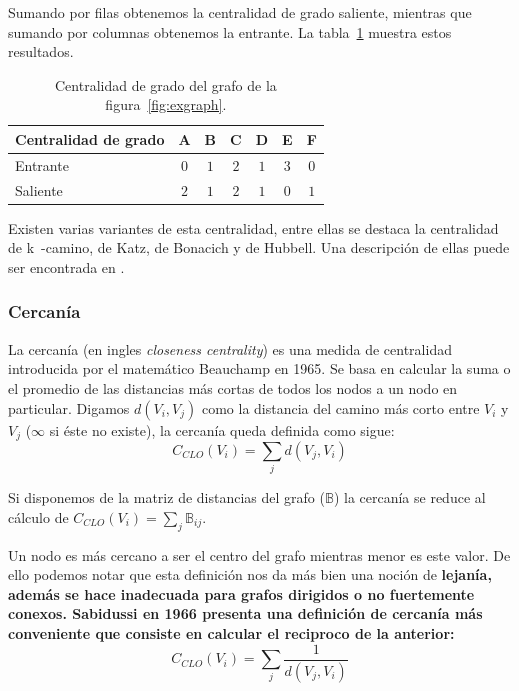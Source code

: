 Sumando por filas obtenemos la centralidad de grado saliente, mientras que
sumando por columnas obtenemos la entrante. La tabla~\ref{tab:excgrad} muestra
estos resultados.
\begin{table}[htpb]
  \centering
  \begin{tabular}{|l|c|c|c|c|c|c|}
    \hline
    Centralidad de grado &  A  &  B  &  C  &  D  &  E  &  F  \\\hline
    Entrante             & $0$ & $1$ & $2$ & $1$ & $3$ & $0$ \\\hline
    Saliente             & $2$ & $1$ & $2$ & $1$ & $0$ & $1$ \\\hline
  \end{tabular}
  \caption{Centralidad de grado del grafo de la figura~\ref{fig:exgraph}.}
  \label{tab:excgrad}
\end{table}

Existen varias variantes de esta centralidad, entre ellas se destaca la
centralidad de k~-camino, de Katz, de Bonacich y de Hubbell. Una descripción de
ellas puede ser encontrada en \cite{sun2011survey}.

\subsubsection{Cercanía}
La cercanía (en ingles \emph{closeness centrality}) es una medida de centralidad
introducida por el matemático Beauchamp en 1965\cite{beauchamp1965improved}. Se
basa en calcular la suma o el promedio de las distancias más cortas de todos los
nodos a un nodo en particular. Digamos $d(V_i, V_j)$ como la distancia del
camino más corto entre $V_i$ y $V_j$ ($\infty$ si éste no existe), la cercanía
queda definida como sigue:
\begin{equation}
  \label{eq:far}
  C_{CLO}(V_i) = \sum_{j} d(V_j, V_i)
\end{equation}

Si disponemos de la matriz de distancias del grafo ($\mathbb{B}$) la cercanía
se reduce al cálculo de $ C_{CLO}(V_i) = \sum_{j} \mathbb{B}_{ij} $.

Un nodo es más cercano a ser el centro del grafo mientras menor es este valor.
De ello podemos notar que esta definición nos da más bien una noción de
\bf{lejanía}, además se hace inadecuada para grafos dirigidos o no fuertemente
conexos. 
Sabidussi en 1966\cite{sabidussi1966centrality} presenta una definición
de cercanía más conveniente que consiste en calcular el reciproco de la
anterior: 
\begin{equation}
  \label{eq:clo}
  C_{CLO}(V_i) = \sum_{j} \frac{1}{d(V_j, V_i)}
\end{equation}

